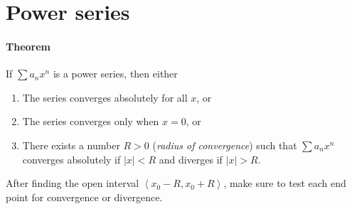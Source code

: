 \documentclass[a4paper,twocolumn,10pt]{article}
\begin{document}
  \section*{Power series}
  \paragraph{Theorem} If $\sum a_n x^n$ is a power series, then either
  \begin{enumerate}
    \item The series converges absolutely for all $x$, or
    \item The series converges only when $x=0$, or
    \item There exists a number $R>0$ (\textit{radius of convergence}) such
      that $\sum a_n x^n$ converges absolutely if $|x| < R$ and diverges if
      $|x| > R$.
  \end{enumerate}
  After finding the open interval $\left< x_0-R, x_0+R \right>$, make sure to
  test each end point for convergence or divergence.
\end{document}
